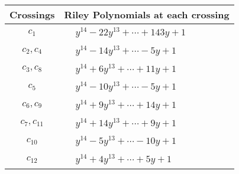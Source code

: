 \documentclass[1p]{elsarticle_modified}
\theoremstyle{definition}
\begin{document}
\begin{tabular}{m{50pt}|m{274pt}}
Crossings & \hspace{64pt}Riley Polynomials at each crossing \\
\hline $$\begin{aligned}c_{1}\end{aligned}$$&$\begin{aligned}
&y^{14}-22 y^{13}+\cdots+143 y+1
\end{aligned}$\\
\hline $$\begin{aligned}c_{2},c_{4}\end{aligned}$$&$\begin{aligned}
&y^{14}-14 y^{13}+\cdots-5 y+1
\end{aligned}$\\
\hline $$\begin{aligned}c_{3},c_{8}\end{aligned}$$&$\begin{aligned}
&y^{14}+6 y^{13}+\cdots+11 y+1
\end{aligned}$\\
\hline $$\begin{aligned}c_{5}\end{aligned}$$&$\begin{aligned}
&y^{14}-10 y^{13}+\cdots-5 y+1
\end{aligned}$\\
\hline $$\begin{aligned}c_{6},c_{9}\end{aligned}$$&$\begin{aligned}
&y^{14}+9 y^{13}+\cdots+14 y+1
\end{aligned}$\\
\hline $$\begin{aligned}c_{7},c_{11}\end{aligned}$$&$\begin{aligned}
&y^{14}+14 y^{13}+\cdots+9 y+1
\end{aligned}$\\
\hline $$\begin{aligned}c_{10}\end{aligned}$$&$\begin{aligned}
&y^{14}-5 y^{13}+\cdots-10 y+1
\end{aligned}$\\
\hline $$\begin{aligned}c_{12}\end{aligned}$$&$\begin{aligned}
&y^{14}+4 y^{13}+\cdots+5 y+1
\end{aligned}$\\
\hline
\end{tabular}\\~\\
\end{document}
